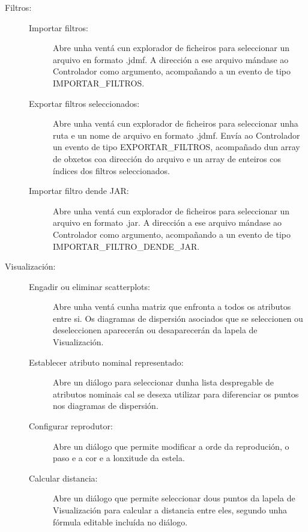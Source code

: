 \begin{description}
\item[Filtros:] \hfill

\begin{description}

\item[Importar filtros:] \hfill
Abre unha ventá cun explorador de ficheiros para seleccionar un arquivo en formato .jdmf. A dirección a ese arquivo mándase ao Controlador como argumento, acompañando a un evento de tipo IMPORTAR\_FILTROS.

\item[Exportar filtros seleccionados:] \hfill
Abre unha ventá cun explorador de ficheiros para seleccionar unha ruta e un nome de arquivo en formato .jdmf. Envía ao Controlador un evento de tipo EXPORTAR\_FILTROS, acompañado dun array de obxetos coa dirección do arquivo e un array de enteiros cos índices dos filtros seleccionados.

\item[Importar filtro dende JAR:] \hfill
Abre unha ventá cun explorador de ficheiros para seleccionar un arquivo en formato .jar. A dirección a ese arquivo mándase ao Controlador como argumento, acompañando a un evento de tipo IMPORTAR\_FILTRO\_DENDE\_JAR.

\end{description}

\item[Visualización:] \hfill

\begin{description}

\item[Engadir ou eliminar scatterplots:] \hfill
Abre unha ventá cunha matriz que enfronta a todos os atributos entre si. Os diagramas de dispersión asociados que se seleccionen ou deseleccionen aparecerán ou desaparecerán da lapela de Visualización.

\item[Establecer atributo nominal representado:] \hfill
Abre un diálogo para seleccionar dunha lista despregable de atributos nominais cal se desexa utilizar para diferenciar os puntos nos diagramas de dispersión.

\item[Configurar reprodutor:] \hfill
Abre un diálogo que permite modificar a orde da reprodución, o paso e a cor e a lonxitude da estela.

\item[Calcular distancia:] \hfill
Abre un diálogo que permite seleccionar dous puntos da lapela de Visualización para calcular a distancia entre eles, segundo unha fórmula editable incluída no diálogo.


\end{description}
\end{description}
